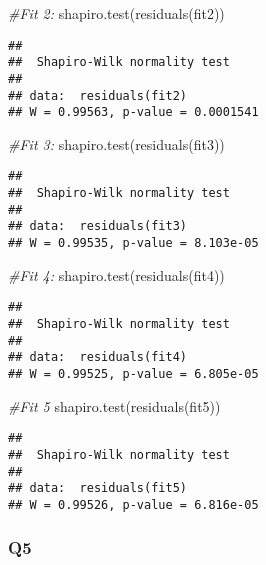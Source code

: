\documentclass[
]{article}
\newenvironment{Shaded}{\begin{snugshade}}{\end{snugshade}}
\newcommand{\CommentTok}[1]{\textcolor[rgb]{0.56,0.35,0.01}{\textit{#1}}}
\newcommand{\FunctionTok}[1]{\textcolor[rgb]{0.00,0.00,0.00}{#1}}
\newcommand{\NormalTok}[1]{#1}
\begin{document}
\begin{Shaded}
\begin{Highlighting}[]
\CommentTok{\#Fit 2:}
\FunctionTok{shapiro.test}\NormalTok{(}\FunctionTok{residuals}\NormalTok{(fit2))}
\end{Highlighting}
\end{Shaded}

\begin{verbatim}
## 
##  Shapiro-Wilk normality test
## 
## data:  residuals(fit2)
## W = 0.99563, p-value = 0.0001541
\end{verbatim}

\begin{Shaded}
\begin{Highlighting}[]
\CommentTok{\#Fit 3:}
\FunctionTok{shapiro.test}\NormalTok{(}\FunctionTok{residuals}\NormalTok{(fit3))}
\end{Highlighting}
\end{Shaded}

\begin{verbatim}
## 
##  Shapiro-Wilk normality test
## 
## data:  residuals(fit3)
## W = 0.99535, p-value = 8.103e-05
\end{verbatim}

\begin{Shaded}
\begin{Highlighting}[]
\CommentTok{\#Fit 4:}
\FunctionTok{shapiro.test}\NormalTok{(}\FunctionTok{residuals}\NormalTok{(fit4))}
\end{Highlighting}
\end{Shaded}

\begin{verbatim}
## 
##  Shapiro-Wilk normality test
## 
## data:  residuals(fit4)
## W = 0.99525, p-value = 6.805e-05
\end{verbatim}

\begin{Shaded}
\begin{Highlighting}[]
\CommentTok{\#Fit 5}
\FunctionTok{shapiro.test}\NormalTok{(}\FunctionTok{residuals}\NormalTok{(fit5))}
\end{Highlighting}
\end{Shaded}

\begin{verbatim}
## 
##  Shapiro-Wilk normality test
## 
## data:  residuals(fit5)
## W = 0.99526, p-value = 6.816e-05
\end{verbatim}

\hypertarget{q5}{%
\subsubsection{Q5}\label{q5}}
\end{document}
